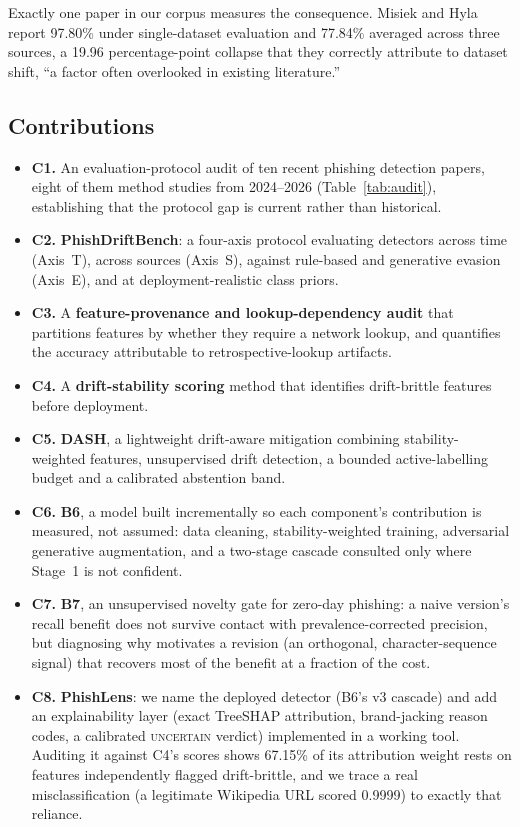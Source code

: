 \documentclass[conference]{IEEEtran}
\begin{document}
Exactly one paper in our corpus measures the consequence. Misiek and
Hyla~\cite{misiek2026xgboost} report 97.80\% under single-dataset evaluation
and 77.84\% averaged across three sources, a 19.96 percentage-point collapse
that they correctly attribute to dataset shift, ``a factor often overlooked in
existing literature.''

\subsection{Contributions}
\label{sec:contributions}

\begin{itemize}
\item \textbf{C1.} An evaluation-protocol audit of ten recent phishing
      detection papers, eight of them method studies from 2024--2026
      (Table~\ref{tab:audit}), establishing that the
      protocol gap is current rather than historical.
\item \textbf{C2.} \textbf{PhishDriftBench}: a four-axis protocol evaluating
      detectors across time (Axis~T), across sources (Axis~S), against
      rule-based and generative evasion (Axis~E), and at deployment-realistic
      class priors.
\item \textbf{C3.} A \textbf{feature-provenance and lookup-dependency audit}
      that partitions features by whether they require a network lookup, and
      quantifies the accuracy attributable to retrospective-lookup artifacts.
\item \textbf{C4.} A \textbf{drift-stability scoring} method that identifies
      drift-brittle features before deployment.
\item \textbf{C5.} \textbf{DASH}, a lightweight drift-aware mitigation combining
      stability-weighted features, unsupervised drift detection, a bounded
      active-labelling budget and a calibrated abstention band.
\item \textbf{C6.} \textbf{B6}, a model built incrementally so each
      component's contribution is measured, not assumed: data cleaning,
      stability-weighted training, adversarial generative augmentation,
      and a two-stage cascade consulted only where Stage~1 is not
      confident.
\item \textbf{C7.} \textbf{B7}, an unsupervised novelty gate for zero-day
      phishing: a naive version's recall benefit does not survive contact
      with prevalence-corrected precision, but diagnosing why motivates a
      revision (an orthogonal, character-sequence signal) that recovers
      most of the benefit at a fraction of the cost.
\item \textbf{C8.} \textbf{PhishLens}: we name the deployed detector
      (B6's v3 cascade) and add an explainability layer (exact TreeSHAP
      attribution, brand-jacking reason codes, a calibrated
      \textsc{uncertain} verdict) implemented in a working tool.
      Auditing it against C4's scores shows 67.15\% of its attribution
      weight rests on features independently flagged drift-brittle, and we
      trace a real misclassification (a legitimate Wikipedia URL scored
      0.9999) to exactly that reliance.
\end{itemize}
\end{document}
